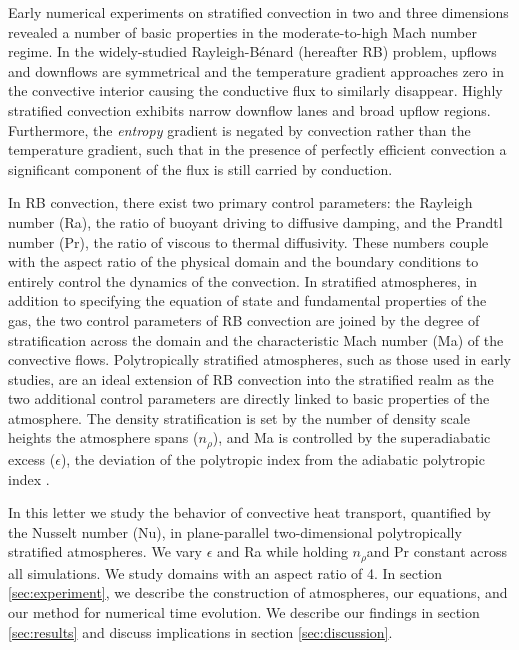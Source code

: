 \documentclass[aps, prl, twocolumn, nofootinbib, groupedaddress, amsfonts, amssymb, amsmath]{revtex4-1}
\newcommand{\RB}{Rayleigh-B\'{e}nard }
\newcommand{\nrho}{\ensuremath{n_{\rho}}}
\begin{document}
Early numerical experiments on stratified convection
in two \cite{graham1975, chan&all1982,
hurlburt&all1984, cattaneo&all1990} and three \cite{cattaneo&all1991, brummell&all1996} dimensions
revealed a number of basic properties in the moderate-to-high Mach number regime.
In the widely-studied \RB (hereafter RB) problem, upflows and downflows are symmetrical and
the temperature gradient approaches zero in the convective interior causing the conductive flux to similarly 
disappear.  Highly stratified convection exhibits narrow downflow lanes and broad upflow regions.
Furthermore, the \emph{entropy} gradient is negated by convection rather than the temperature gradient, such
that in the presence of perfectly efficient convection a significant component of the flux is still
carried by conduction.

In RB convection, there exist two primary control parameters: the Rayleigh number (Ra), the ratio of
buoyant driving to diffusive damping, and the Prandtl number (Pr), the ratio of viscous to thermal
diffusivity.  These numbers couple with the aspect ratio of the physical domain and the boundary conditions
to entirely control the
dynamics of the convection.  In stratified atmospheres, in addition to specifying the equation of state and
fundamental properties of the gas, the two control parameters of RB convection are joined by the degree of
stratification across the domain and the characteristic Mach number (Ma) of the convective flows.  
Polytropically stratified atmospheres, such as those used in early studies, are an ideal extension of
RB convection into the stratified realm as the two additional control parameters are directly linked to
basic properties of the atmosphere.  The density stratification is set by the number of density scale heights
the atmosphere spans (\nrho), and Ma is controlled by the superadiabatic excess ($\epsilon$),
the deviation of the polytropic index from the adiabatic polytropic index \cite{graham1975}.

In this letter we study the behavior of convective heat transport, quantified by
the Nusselt number (Nu), in plane-parallel two-dimensional polytropically stratified atmospheres.  
We vary $\epsilon$ and Ra while holding \nrho and Pr
constant across all simulations.  We study domains with an aspect ratio of 4.  In section 
\ref{sec:experiment}, we describe the construction of atmospheres, our equations, and our method for
numerical time evolution.  We describe our findings in section \ref{sec:results} and discuss
implications in section \ref{sec:discussion}.
\end{document}
